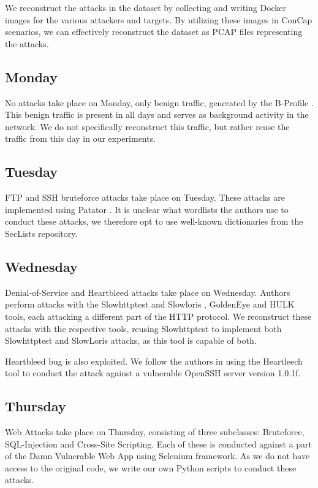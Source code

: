 \documentclass[conference]{IEEEtran}
\begin{document}
	We reconstruct the attacks in the dataset by collecting and writing Docker images for the various attackers and targets. By utilizing these images in ConCap scenarios, we can effectively reconstruct the dataset as PCAP files representing the attacks.
	
	\subsection{Monday}
	No attacks take place on Monday, only benign traffic, generated by the B-Profile \cite{b_profile}. This benign traffic is present in all days and serves as background activity in the network. We do not specifically reconstruct this traffic, but rather reuse the traffic from this day in our experiments.
	
	\subsection{Tuesday}
	FTP and SSH bruteforce attacks take place on Tuesday. These attacks are implemented using Patator \cite{patator}. It is unclear what wordlists the authors use to conduct these attacks, we therefore opt to use well-known dictionaries from the SecLists \cite{seclists} repository.
	
	\subsection{Wednesday}
	Denial-of-Service and Heartbleed attacks take place on Wednesday. Authors perform attacks with the Slowhttptest and Slowloris \cite{slowhttptest}, GoldenEye \cite{goldeneye} and HULK \cite{hulk} tools, each attacking a different part of the HTTP protocol. We reconstruct these attacks with the respective tools, reusing Slowhttptest to implement both Slowhttptest and SlowLoris attacks, as this tool is capable of both.
	
	Heartbleed bug \cite{heartbleed} is also exploited. We follow the authors in using the Heartleech \cite{heartleech} tool to conduct the attack against a vulnerable OpenSSH server version 1.0.1f.
	
	\subsection{Thursday}
	Web Attacks take place on Thursday, consisting of three subclasses: Bruteforce, SQL-Injection and Cross-Site Scripting. Each of these is conducted against a part of the Damn Vulnerable Web App \cite{dvwa} using Selenium framework. As we do not have access to the original code, we write our own Python scripts to conduct these attacks.
	
\end{document}
